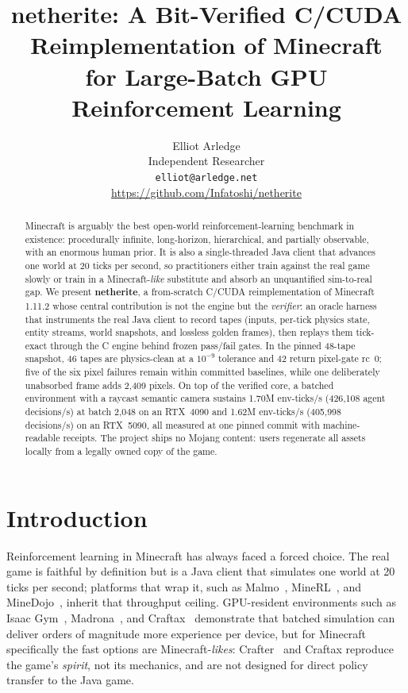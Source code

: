 \documentclass[11pt]{article}
\title{\textbf{netherite}: A Bit-Verified C/CUDA Reimplementation of Minecraft\\for Large-Batch GPU Reinforcement Learning}
\author{Elliot Arledge\\
Independent Researcher\\
\texttt{elliot@arledge.net}\\
\url{https://github.com/Infatoshi/netherite}}
\date{}
\begin{document}
\maketitle

\begin{abstract}
Minecraft is arguably the best open-world reinforcement-learning benchmark in existence: procedurally infinite, long-horizon, hierarchical, and partially observable, with an enormous human prior. It is also a single-threaded Java client that advances one world at 20 ticks per second, so practitioners either train against the real game slowly or train in a Minecraft-\emph{like} substitute and absorb an unquantified sim-to-real gap. We present \textbf{netherite}, a from-scratch C/CUDA reimplementation of Minecraft 1.11.2 whose central contribution is not the engine but the \emph{verifier}: an oracle harness that instruments the real Java client to record tapes (inputs, per-tick physics state, entity streams, world snapshots, and lossless golden frames), then replays them tick-exact through the C engine behind frozen pass/fail gates. In the pinned 48-tape snapshot, 46 tapes are physics-clean at a $10^{-9}$ tolerance and 42 return pixel-gate rc~0; five of the six pixel failures remain within committed baselines, while one deliberately unabsorbed frame adds 2{,}409 pixels. On top of the verified core, a batched environment with a raycast semantic camera sustains 1.70M env-ticks/s (426{,}108 agent decisions/s) at batch 2{,}048 on an RTX~4090 and 1.62M env-ticks/s (405{,}998 decisions/s) on an RTX~5090, all measured at one pinned commit with machine-readable receipts. The project ships no Mojang content: users regenerate all assets locally from a legally owned copy of the game.
\end{abstract}

\section{Introduction}
\label{sec:intro}

Reinforcement learning in Minecraft has always faced a forced choice. The real game is faithful by definition but is a Java client that simulates one world at 20 ticks per second; platforms that wrap it, such as Malmo~\citep{johnson2016malmo}, MineRL~\citep{guss2019minerl}, and MineDojo~\citep{fan2022minedojo}, inherit that throughput ceiling. GPU-resident environments such as Isaac Gym~\citep{makoviychuk2021isaacgym}, Madrona~\citep{shacklett2023madrona}, and Craftax~\citep{matthews2024craftax} demonstrate that batched simulation can deliver orders of magnitude more experience per device, but for Minecraft specifically the fast options are Minecraft-\emph{likes}: Crafter~\citep{hafner2022crafter} and Craftax reproduce the game's \emph{spirit}, not its mechanics, and are not designed for direct policy transfer to the Java game.
\end{document}
